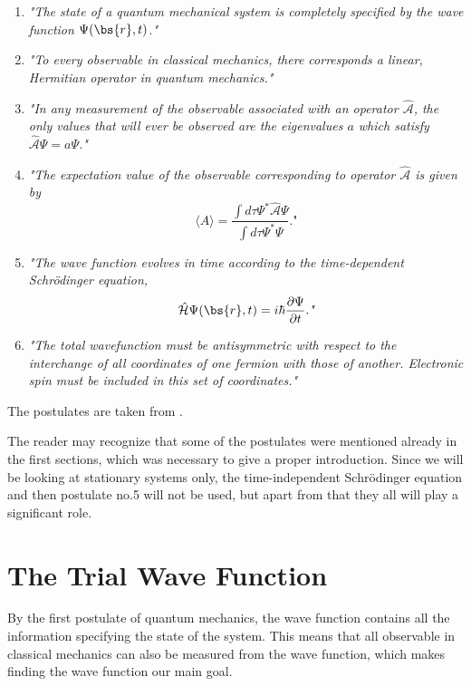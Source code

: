 \begin{enumerate}
\item \textit{"The state of a quantum mechanical system is completely specified by the wave function $\Psi(\bs{r},t)$."}

\item \textit{"To every observable in classical mechanics, there corresponds a linear, Hermitian operator in quantum mechanics."}

\item \textit{"In any measurement of the observable associated with an operator $\hat{\mathcal{A}}$, the only values that will ever be observed are the eigenvalues $a$ which satisfy $\hat{\mathcal{A}}\Psi=a\Psi$."}

\item \textit{"The expectation value of the observable corresponding to operator $\hat{\mathcal{A}}$ is given by
$$\langle A\rangle=\frac{\int d\tau\Psi^*\hat{\mathcal{A}}\Psi}{\int d\tau\Psi^*\Psi}.\textit{"}$$}

\item \textit{"The wave function evolves in time according to the time-dependent Schrödinger equation,
$$\hat{\mathcal{H}}\Psi(\bs{r},t)=i\hbar\frac{\partial\Psi}{\partial t}.\textit{"}$$}

\item \textit{"The total wavefunction must be antisymmetric with respect to the interchange of all coordinates of one fermion with those of another. Electronic spin must be included in this set of coordinates."} 
\end{enumerate}
The postulates are taken from \cite{sherrill_david_postulates_2003}.

The reader may recognize that some of the postulates were mentioned already in the first sections, which was necessary to give a proper introduction. Since we will be looking at stationary systems only, the time-independent Schrödinger equation and then postulate no.5 will not be used, but apart from that they all will play a significant role. 

\section{The Trial Wave Function} \label{subsec:wavefunction}
By the first postulate of quantum mechanics, the wave function contains all the information specifying the state of the system. This means that all observable in classical mechanics can also be measured from the wave function, which makes finding the wave function our main goal.

